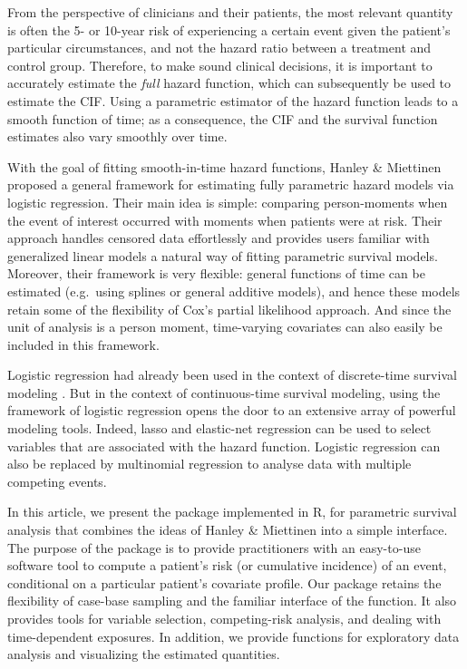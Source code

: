 From the perspective of clinicians and their patients, the most relevant
quantity is often the 5- or 10-year risk of experiencing a certain event
given the patient's particular circumstances, and not the hazard ratio
between a treatment and control group. Therefore, to make sound clinical
decisions, it is important to accurately estimate the \emph{full} hazard
function, which can subsequently be used to estimate the CIF. Using a
parametric estimator of the hazard function leads to a smooth function
of time; as a consequence, the CIF and the survival function estimates
also vary smoothly over time.

With the goal of fitting smooth-in-time hazard functions, Hanley \&
Miettinen \citeyearpar{hanley2009fitting} proposed a general framework
for estimating fully parametric hazard models via logistic regression.
Their main idea is simple: comparing person-moments when the event of
interest occurred with moments when patients were at risk. Their
approach handles censored data effortlessly and provides users familiar
with generalized linear models a natural way of fitting parametric
survival models. Moreover, their framework is very flexible: general
functions of time can be estimated (e.g.~using splines or general
additive models), and hence these models retain some of the flexibility
of Cox's partial likelihood approach. And since the unit of analysis is
a person moment, time-varying covariates can also easily be included in
this framework.

Logistic regression had already been used in the context of
discrete-time survival modeling \citep{cox1972regression}. But in the
context of continuous-time survival modeling, using the framework of
logistic regression opens the door to an extensive array of powerful
modeling tools. Indeed, lasso and elastic-net regression can be used to
select variables that are associated with the hazard function. Logistic
regression can also be replaced by multinomial regression to analyse
data with multiple competing events.

In this article, we present the  package
\citep{casebase-package} implemented in R, for parametric survival
analysis that combines the ideas of Hanley \& Miettinen
\citeyearpar{hanley2009fitting} into a simple interface. The purpose of
the  package is to provide practitioners with an
easy-to-use software tool to compute a patient's risk (or cumulative
incidence) of an event, conditional on a particular patient's covariate
profile. Our package retains the flexibility of case-base sampling and
the familiar interface of the  function. It also provides
tools for variable selection, competing-risk analysis, and dealing with
time-dependent exposures. In addition, we provide functions for
exploratory data analysis and visualizing the estimated quantities.

